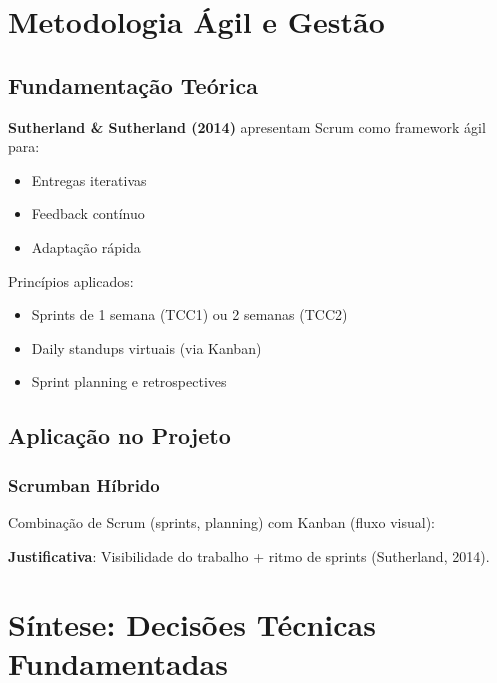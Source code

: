 \documentclass[12pt,a4paper]{article}
\begin{document}
\section{Metodologia Ágil e Gestão}

\subsection{Fundamentação Teórica}

\textbf{Sutherland \& Sutherland (2014)} apresentam Scrum como framework ágil para:
\begin{itemize}
    \item Entregas iterativas
    \item Feedback contínuo
    \item Adaptação rápida
\end{itemize}

Princípios aplicados:
\begin{itemize}
    \item Sprints de 1 semana (TCC1) ou 2 semanas (TCC2)
    \item Daily standups virtuais (via Kanban)
    \item Sprint planning e retrospectives
\end{itemize}

\subsection{Aplicação no Projeto}

\subsubsection{Scrumban Híbrido}

Combinação de Scrum (sprints, planning) com Kanban (fluxo visual):

\textbf{Justificativa}: Visibilidade do trabalho + ritmo de sprints (Sutherland, 2014).

\section{Síntese: Decisões Técnicas Fundamentadas}
\end{document}
